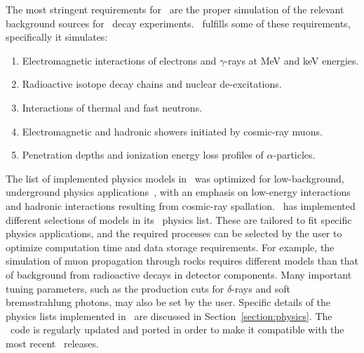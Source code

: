 \documentclass[article]{IEEEtran}
\begin{document}
The most stringent
requirements for \MaGe\ are the proper simulation of the relevant
background sources for \nubb\ decay
experiments. \GF\ fulfills some of these requirements, specifically it simulates:
\begin{enumerate}
\item Electromagnetic interactions of electrons and $\gamma$-rays at MeV and keV energies.
\item Radioactive isotope decay chains and nuclear de-excitations. 
\item Interactions of thermal and fast neutrons. 
\item Electromagnetic and hadronic showers
initiated by cosmic-ray muons.
\item Penetration depths and ionization energy loss profiles of 
$\alpha$-particles. 
\end{enumerate}
The list of implemented physics models in \MaGe\ was optimized for
low-background, underground physics
applications~\cite{Bauer:2004an}, with an emphasis on low-energy
interactions and hadronic interactions resulting from cosmic-ray
spallation. 
\MaGe\ has implemented different selections of models in its \GF\ physics list. These are tailored to fit specific physics applications, and the required processes can be selected by the user to optimize computation time and data storage requirements. For example, the simulation of muon propagation through rocks requires different models than that of background from radioactive decays in detector components. Many
important tuning parameters, such as the	 production cuts for $\delta$-rays and soft bremsstrahlung photons, may also be set by the user. 
Specific details of the physics lists implemented in \MaGe\ are discussed in Section~\ref{section:physics}. The \MaGe\ code is regularly updated and ported in order to make
it compatible with the most recent \GF\ releases.\\
\end{document}
